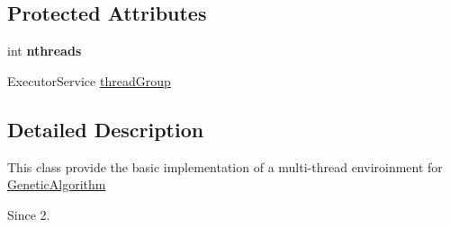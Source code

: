 \subsection*{Protected Attributes}
\begin{DoxyCompactItemize}
\item 
\hypertarget{classjenes_1_1utils_1_1multitasking_1_1_multi_thread_runner_aa20fe700a6b2abd3694b4a1d5629db8f}{int {\bfseries nthreads}}\label{classjenes_1_1utils_1_1multitasking_1_1_multi_thread_runner_aa20fe700a6b2abd3694b4a1d5629db8f}

\item 
Executor\-Service \hyperlink{classjenes_1_1utils_1_1multitasking_1_1_multi_thread_runner_afd9939cc7a261bd4bb6c8f3de6f58337}{thread\-Group}
\end{DoxyCompactItemize}


\subsection{Detailed Description}
This class provide the basic implementation of a multi-\/thread enviroinment for \hyperlink{}{Genetic\-Algorithm}

\begin{DoxySince}{Since}
2. 
\end{DoxySince}


